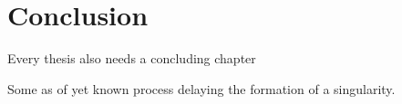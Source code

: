 \chapter{Conclusion}\label{chapter:6}

Every thesis also needs a concluding chapter

Some as of yet known process delaying the formation of a singularity.